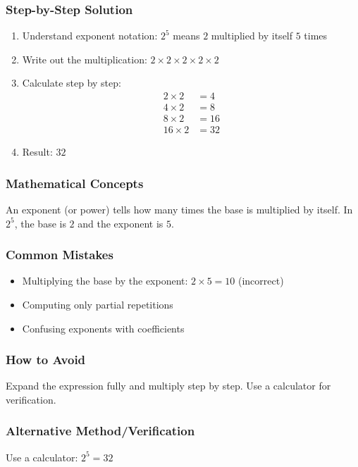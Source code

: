 \documentclass[12pt,a4paper]{article}
\begin{document}
\subsubsection*{Step-by-Step Solution}
\begin{enumerate}
    \item Understand exponent notation: $2^5$ means $2$ multiplied by itself $5$ times
    \item Write out the multiplication: $2 \times 2 \times 2 \times 2 \times 2$
    \item Calculate step by step:
    \begin{align*}
        2 \times 2 &= 4 \\
        4 \times 2 &= 8 \\
        8 \times 2 &= 16 \\
        16 \times 2 &= 32
    \end{align*}
    \item Result: $32$
\end{enumerate}

\subsubsection*{Mathematical Concepts}
An exponent (or power) tells how many times the base is multiplied by itself. In $2^5$, the base is $2$ and the exponent is $5$.

\subsubsection*{Common Mistakes}
\begin{itemize}
    \item Multiplying the base by the exponent: $2 \times 5 = 10$ (incorrect)
    \item Computing only partial repetitions
    \item Confusing exponents with coefficients
\end{itemize}

\subsubsection*{How to Avoid}
Expand the expression fully and multiply step by step. Use a calculator for verification.

\subsubsection*{Alternative Method/Verification}
Use a calculator: $2^5 = 32$ 
\end{document}
